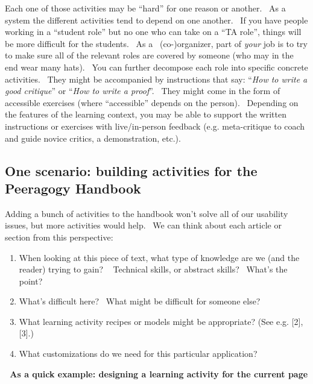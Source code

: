 Each one of those activities may be ``hard'' for one reason or another.~
As a system the different activities tend to depend on one another. ~If
you have people working in a ``student role'' but no one who can take on
a ``TA role'', things will be more difficult for the students. ~As a~
(co-)organizer, part of \emph{your} job is to try to make sure all of
the relevant roles are covered by someone (who may in the end wear many
hats).~ You can further decompose each role into specific concrete
activities. ~They might be accompanied by instructions that say:
``\emph{How to write a good critique}'' or ``\emph{How to write a
proof}''.~ They might come in the form of accessible exercises (where
``accessible'' depends on the person).~ Depending on the features of the
learning context, you may be able to support the written instructions or
exercises with live/in-person feedback (e.g. meta-critique to coach and
guide novice critics, a demonstration, etc.).

\subsection{One scenario: building activities for the Peeragogy
Handbook}

Adding a bunch of activities to the handbook won't solve all of our
usability issues, but more activities would help.~ We can think about
each article or section from this perspective:

\begin{enumerate}
\itemsep1pt\parskip0pt
\item
  When looking at this piece of text, what type of knowledge are we (and
  the reader) trying to gain? ~ Technical skills, or abstract skills?~
  What's the point?
\item
  What's difficult here? ~What might be difficult for someone else?
\item
  What learning activity recipes or models might be appropriate? (See
  e.g. {[}2{]}, {[}3{]}.)
\item
  What customizations do we need for this particular application?
\end{enumerate}

\noindent\textbf{\emph{~}As a quick example: designing a learning activity for
the current page}

